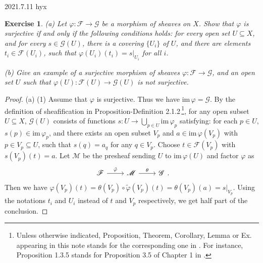 \documentclass{amsart}
\newtheorem{exe}{Exercise}[subsection]
\begin{document}
2021.7.11 hyx
\begin{exe}
	\label{2.1.3}
    (a) Let $\varphi :\mathscr{F} \rightarrow\mathscr{G} $ be a morphism of sheaves on $X$. Show that
    $\varphi$ is surjective if and only if the following conditions holds: for every open set $U\subseteq X$, and for
    every $s\in\mathscr{G}(U)$, there is a covering $\{U_i\}$ of $U$, and there are elements $t_i\in\mathscr{F}(U_i)$,
    such that $\varphi(U_i)(t_i)=s|_{U_i}$ for all $i$.

    (b) Give an example of a surjective morphism of sheaves $\varphi :\mathscr{F} \rightarrow  \mathscr{G} $,
    and an open set $U$ such that $\varphi(U):\mathscr{F}(U) \rightarrow  \mathscr{G}(U) $ is not surjective.
\end{exe}

\begin{proof}
    (a) (1) Assume that $\varphi$ is surjective. Thus we have $\mathrm{im}\,\varphi=\mathscr{G}$. By the definition of sheafification in Proposition-Definition 2.1.2\,\footnote{Unless otherwise indicated, Proposition, Theorem, Corollary, Lemma or Ex. appearing in this note stands for the corresponding one in \cite{HAR}. For instance, Proposition 1.3.5 stands for Proposition 3.5 of Chapter 1 in \cite{HAR}.}, for any open subset $U\subseteq X$, $\mathscr{G}(U)$ consists of functions $s:U\to\bigcup_{p\in U}\mathrm{im}\,\varphi_p$ satisfying: for each $p\in U$, $s(p)\in\mathrm{im}\,\varphi_p$, and there exists an open subset $V_p$ and $a\in \mathrm{im}\,\varphi(V_p)$ with $p\in V_p \subseteq U$, such that
    $s(q)=a_q$ for any $q\in V_p$. Choose $t\in\mathscr{F}(V_p)$ with $s(V_p)(t)=a$. Let $\mathscr{M}$ be the presheaf sending $U$ to $\mathrm{im}\,\varphi(U)$ and factor $\varphi$ as
    \begin{equation*}
    	\begin{tikzcd}
    		\mathscr{F} \arrow[r, "\tilde{\varphi}"] & \mathscr{M} \arrow[r, "\theta"] & \mathscr{G}
    	\end{tikzcd}.
    \end{equation*}
    Then we have $\varphi(V_p)(t)=\theta(V_p)\circ\tilde{\varphi}(V_p)(t)=\theta(V_p)(a)=s|_{V_p}$. Using the notations $t_i$ and $U_i$ instead of $t$ and $V_p$ respectively, we get half part of the conclusion.
    

\end{proof}
\end{document}

